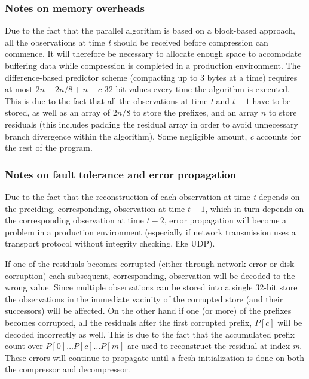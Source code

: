   \subsubsection{Notes on memory overheads}
  Due to the fact that the parallel algorithm is based on a block-based approach, all the observations at time \textit{t} should be received before compression can commence. It will therefore be necessary to allocate
  enough space to accomodate buffering data while compression is completed in a production environment. The difference-based predictor scheme (compacting up to 3 bytes at a time) requires at most $2n + 2n/8 + n + c$ 32-bit values every 
  time the algorithm is executed. This is due to the fact that all the observations at time \textit{t} and $t-1$ have to 
  be stored, as well as an array of $2n/8$ to store the prefixes, and an array $n$ to store residuals (this includes padding the residual array in order to avoid unnecessary branch divergence within the algorithm). Some negligible 
  amount, \textit{c} accounts for the rest of the program.
  \subsubsection{Notes on fault tolerance and error propagation}
  Due to the fact that the reconstruction of each observation at time \textit{t} depends on the preciding, corresponding, observation at time $t-1$, which in turn 
  depends on the corresponding observation at time $t-2$, error propagation will become a problem in a production environment (especially if network transmission uses a transport
  protocol without integrity checking, like UDP). 
  
  If one of the residuals becomes corrupted (either through network error or disk corruption) each subsequent, corresponding, 
  observation will be decoded to the wrong value. Since multiple observations can be stored into a single 32-bit store the observations in the immediate vacinity of the corrupted
  store (and their successors) will be affected. On the other hand if one (or more) of the prefixes becomes corrupted, all the residuals after the first corrupted prefix, $P[c]$ will be decoded 
  incorrectly as well. This is due to the fact that the accumulated prefix count over $P[0]\dots P[c]\dots P[m]$ are used to reconstruct the residual at index \textit{m}. These 
  errors will continue to propagate until a fresh initialization is done on both the compressor and decompressor. 
    
